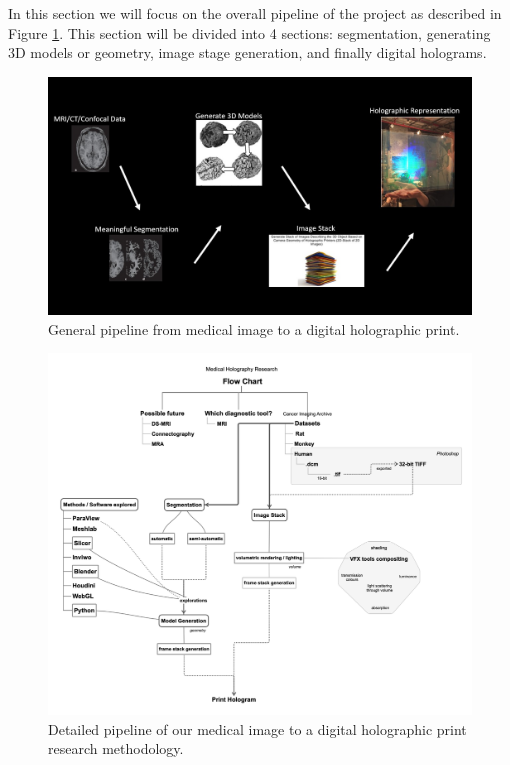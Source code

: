 In this section we will focus on the overall pipeline of the project as described in Figure \ref{fig:pipeline}.  This section will be divided into 4 sections: segmentation, generating 3D models or geometry, image stage generation, and finally digital holograms. 

\begin{figure}[H]
  \centering
  \includegraphics[width=\linewidth]{img/pipeline.jpg}
  \caption{General pipeline from medical image to a digital holographic print.}
  \label{fig:pipeline}
\end{figure}

\begin{figure}[H]
  \centering
  \includegraphics[width=\linewidth]{img/detailedFlowChart.png}
  \caption{Detailed pipeline of our medical image to a digital holographic print research methodology.}
  \label{fig:detailedPipeline}
\end{figure}



